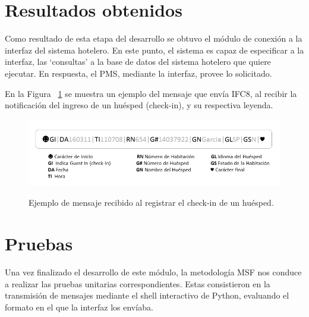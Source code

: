 \section{Resultados obtenidos}
		Como resultado de esta etapa del desarrollo se obtuvo el módulo de conexión a la interfaz del sistema hotelero. En este punto, el sistema es capaz de especificar a la interfaz, las ‘consultas’ a la base de datos del sistema hotelero que quiere ejecutar. En respuesta, el PMS, mediante la interfaz, provee lo solicitado.
		
	En la Figura ~\ref{fig:estsyn} se muestra un ejemplo del mensaje que envía IFC8, al recibir la notificación del ingreso de un huésped (check-in), y su respectiva leyenda.

\begin{figure}[ht]
  \centering
  \includegraphics[scale=0.6,type=png,ext=.png,read=.png]{imagenes/ejemploDetallado} \\
  \caption{Ejemplo de mensaje recibido al registrar el check-in de un huésped.}
  \label{fig:estsyn}
\end{figure}

\section{Pruebas}
			Una vez finalizado el desarrollo de este módulo, la metodología MSF nos conduce a realizar las pruebas unitarias correspondientes. Estas consistieron en la transmisión de mensajes mediante el shell interactivo de Python, evaluando el formato en el que la interfaz los envíaba.